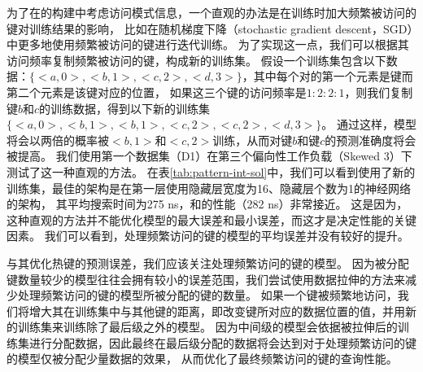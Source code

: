 为了在{\li}的构建中考虑访问模式信息，一个直观的办法是在训练时加大频繁被访问的键对训练结果的影响，
比如在随机梯度下降（stochastic gradient descent，SGD）中更多地使用频繁被访问的键进行迭代训练。
为了实现这一点，我们可以根据其访问频率复制频繁被访问的键，构成新的训练集。
假设一个训练集包含以下数据：$\{<a, 0>, <b, 1>, <c, 2>, <d, 3>\}$，其中每个对的第一个元素是键而第二个元素是该键对应的位置，
如果这三个键的访问频率是$1:2:2:1$，则我们复制键$b$和$c$的训练数据，得到以下新的训练集$\{<a, 0>, <b, 1>, <b, 1>, <c, 2>, <c, 2>, <d, 3>\}$。
通过这样，模型将会以两倍的概率被$<b, 1>$和$<c, 2>$训练，从而对键$b$和键$c$的预测准确度将会被提高。
我们使用第一个数据集（D1）在第三个偏向性工作负载（Skewed 3）下测试了这一种直观的方法。
在表\ref{tab:pattern-int-sol}中，我们可以看到使用了新的训练集，最佳的{\li}架构是在第一层使用隐藏层宽度为16、隐藏层个数为1的神经网络的{\li}架构，
其平均搜索时间为275 ns，和{\li}的性能（282 ns）非常接近。
这是因为，这种直观的方法并不能优化模型的最大误差和最小误差，而这才是决定{\li}性能的关键因素。
我们可以看到，处理频繁访问的键的模型的平均误差并没有较好的提升。


与其优化热键的预测误差，我们应该关注处理频繁访问的键的模型。
因为被分配键数量较少的模型往往会拥有较小的误差范围，我们尝试使用数据拉伸的方法来减少处理频繁访问的键的模型所被分配的键的数量。
如果一个键被频繁地访问，我们将增大其在训练集中与其他键的距离，即改变键所对应的数据位置的值，并用新的训练集来训练除了最后级之外的模型。
因为中间级的模型会依据被拉伸后的训练集进行分配数据，因此最终在最后级分配的数据将会达到对于处理频繁访问的键的模型仅被分配少量数据的效果，
从而优化了最终频繁访问的键的查询性能。

